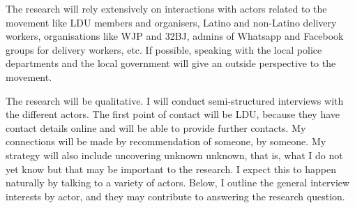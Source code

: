 \documentclass{article}
\begin{document}
The research will rely extensively on interactions with actors related to the movement like LDU members and organisers, Latino and non-Latino delivery workers, organisations like WJP and 32BJ, admins of Whatsapp and Facebook groups for delivery workers, etc. If possible, speaking with the local police departments and the local government will give an outside perspective to the movement.

The research will be qualitative. I will conduct semi-structured interviews with the different actors. The first point of contact will be LDU, because they have contact details online and will be able to provide further contacts. My connections will be made by recommendation of someone, by someone. My strategy will also include uncovering unknown unknown, that is, what I do not yet know but that may be important to the research. I expect this to happen naturally by talking to a variety of actors. Below, I outline the general interview interests by actor, and they may contribute to answering the research question.
\end{document}
